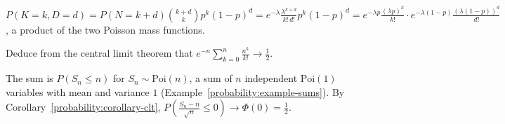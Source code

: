 \begin{solution}
$P(K = k, D = d) = P(N = k + d)\binom{k + d}{k}p^k(1 - p)^d = e^{-\lambda}\frac{\lambda^{k+d}}{k!\,d!}p^k(1 - p)^d = e^{-\lambda p}\frac{(\lambda p)^k}{k!}\cdot e^{-\lambda(1-p)}\frac{(\lambda(1 - p))^d}{d!}$, a product of the two Poisson mass functions.
\end{solution}

\begin{exercise}\label{probability:exercise-clt-gamma}
Deduce from the central limit theorem that $e^{-n}\sum_{k=0}^n\frac{n^k}{k!} \to \frac12$.
\end{exercise}

\begin{solution}
The sum is $P(S_n \leq n)$ for $S_n \sim \mathrm{Poi}(n)$, a sum of $n$ independent $\mathrm{Poi}(1)$ variables with mean and variance $1$ (Example~\ref{probability:example-sums}). By Corollary~\ref{probability:corollary-clt},
$P(\frac{S_n - n}{\sqrt n} \leq 0) \to \Phi(0) = \frac12$.
\end{solution}
